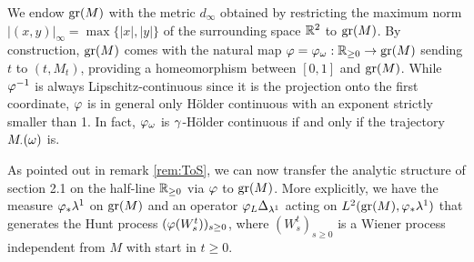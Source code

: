 We endow $\operatorname{gr}(M)$ with the metric $d_\infty$ obtained by restricting the maximum norm $|(x,y)|_\infty=\max\{|x|,|y|\}$ of the surrounding space $\mathbb{R}^2$ to $\operatorname{gr}(M)$. By construction, $\operatorname{gr}(M)$ comes with the natural map $\varphi=\varphi_\omega:\mathbb{R}_{\geq0}\to\operatorname{gr}(M)$ sending $t$ to 
$(t,M_t)$, providing a homeomorphism between $[0,1]$ and $\operatorname{gr}(M)$. 
While $\varphi^{-1}$ is always Lipschitz-continuous since it is the projection onto the first coordinate, $\varphi$ is in general only H\"older continuous with an exponent strictly smaller than 1. In fact, $\varphi_\omega$ is $\gamma$-H\"older continuous if and only if the trajectory $M_\cdot(\omega)$ is.

As pointed out in remark \ref{rem:ToS}, we can now transfer the analytic structure of section 2.1 on the half-line $\mathbb{R}_{\geq0}$ via $\varphi$ to 
$\operatorname{gr}(M)$. More explicitly, we have the measure $\varphi_*\lambda^1$ on $\operatorname{gr}(M)$ and an operator $\varphi_L\Delta_{\lambda^1}$ acting on $L^2(\operatorname{gr}(M),\varphi_*\lambda^1)$ that generates the Hunt process $(\varphi(W_s^t))_{s\geq0}$, where 
$(W_s^t)_{s\geq0}$ is a Wiener process independent from $M$ with start in $t\geq0$.

